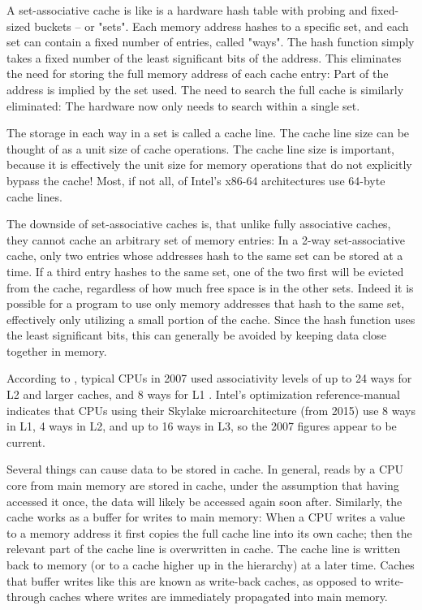 A set-associative cache is like is a hardware hash table with probing and
fixed-sized buckets -- or "sets". Each memory address hashes to a specific set,
and each set can contain a fixed number of entries, called "ways". The hash
function simply takes a fixed number of the least significant bits of the
address. This eliminates the need for storing the full memory address of each
cache entry: Part of the address is implied by the set used. The need to search
the full cache is similarly eliminated: The hardware now only needs to search
within a single set.

The storage in each way in a set is called a cache line. The cache line
size can be thought of as a unit size of cache operations. The cache line size
is important, because it is effectively the unit size for memory operations that
do not explicitly bypass the cache! Most, if not all, of
Intel's x86-64 architectures use 64-byte cache lines\cite{inteloptimize}.

The downside of set-associative caches is, that unlike fully associative
caches, they cannot cache an arbitrary set of memory entries: In a 2-way
set-associative cache, only two entries whose addresses hash to the same set can
be stored at a time. If a third entry hashes to the same set, one of the two
first will be evicted from the cache, regardless of how much free space is in
the other sets. Indeed it is possible for a program to use only memory
addresses that hash to the same set, effectively only utilizing a small portion
of the cache. Since the hash function uses the least significant bits, this can
generally be avoided by keeping data close together in memory. 

According to \citeauthor{whatprogrammersshouldknow}, typical
CPUs in 2007 used associativity levels of up to 24 ways for L2 and larger
caches, and 8 ways for L1 \cite{whatprogrammersshouldknow}. Intel's
optimization reference-manual \cite{inteloptimize} indicates that CPUs using their
Skylake microarchitecture (from 2015) use 8 ways in L1, 4 ways in L2, and up to
16 ways in L3, so the 2007 figures appear to be current.

Several things can cause data to be stored in cache. In general, reads by
a CPU core from main memory are stored in cache, under the
assumption that having accessed it once, the data will likely be accessed again
soon after. Similarly, the cache works as a buffer for writes to main memory:
When a CPU writes a value to a memory address it first copies the full
cache line into its own cache; then the relevant part of the cache line is
overwritten in cache. The cache line is written back to memory (or to a
cache higher up in the hierarchy) at a later time. Caches that buffer writes
like this are known as write-back caches, as opposed to write-through caches
where writes are immediately propagated into main memory.

